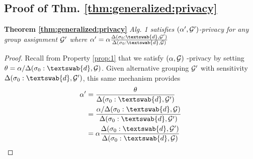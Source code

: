 \subsection{Proof of Thm. \ref{thm:generalized:privacy}} \label{app:thm:generalized}

\textbf{Theorem \ref{thm:generalized:privacy}} \emph{
Alg. 1 satisfies $(\alpha',\mathcal{G}')$-\name privacy for any group assignment $\mathcal{G}'$ where  $ \alpha'=\alpha\frac{\Delta(\sigma_0 : \textswab{d}, \calG')}{\Delta(\sigma_0 : \textswab{d}, \calG)}$ 
}
\begin{proof}
Recall from Property \ref{prop:1} that we satisfy $(\alpha, \mathcal{G})$ \name-privacy by setting $\theta = \alpha / \Delta(\sigma_0:\textswab{d}, \calG)$. Given alternative grouping $\mathcal{G}'$ with sensitivity $\Delta(\sigma_0:\textswab{d}, \calG')$, this same mechanism provides 
\begin{align*}
    \alpha' 
    &= \frac{\theta}{\Delta(\sigma_0:\textswab{d}, \calG')} \\
    &= \frac{\alpha / \Delta(\sigma_0:\textswab{d}, \calG)}{\Delta(\sigma_0:\textswab{d}, \calG')} \\
    &= \alpha \frac{\Delta(\sigma_0:\textswab{d}, \calG')}{\Delta(\sigma_0:\textswab{d}, \calG)}
\end{align*}
\end{proof}


